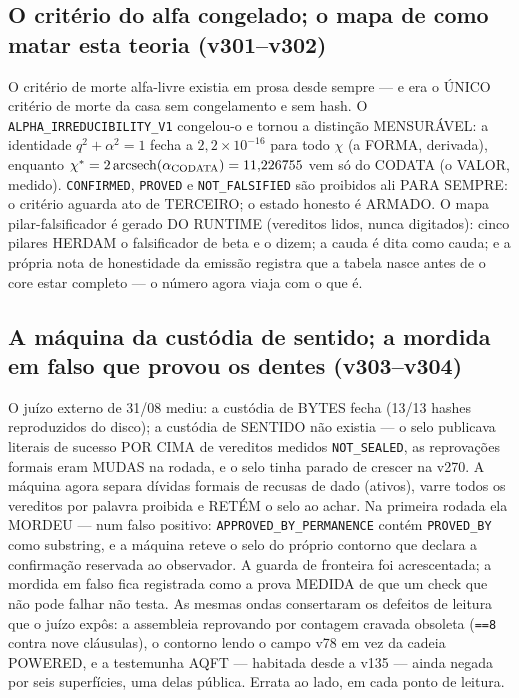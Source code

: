\documentclass[11pt]{article}
\theoremstyle{definition}\newtheorem{deriv}{Derivação}
\begin{document}
\subsection*{O crit\'erio do alfa congelado; o mapa de como matar esta teoria (v301--v302)}O crit\'erio de morte alfa-livre existia em prosa desde sempre --- e era o \'UNICO crit\'erio de morte da casa sem congelamento e sem hash. O \texttt{ALPHA\_IRREDUCIBILITY\_V1} congelou-o e tornou a distin\c{c}\~ao MENSUR\'AVEL: a identidade $q^2+\alpha^2=1$ fecha a $2{,}2\times10^{-16}$ para todo $\chi$ (a FORMA, derivada), enquanto $\chi^*=2\,\mathrm{arcsech}(\alpha_{\rm CODATA})=11{,}226755$ vem s\'o do CODATA (o VALOR, medido). \texttt{CONFIRMED}, \texttt{PROVED} e \texttt{NOT\_FALSIFIED} s\~ao proibidos ali PARA SEMPRE: o crit\'erio aguarda ato de TERCEIRO; o estado honesto \'e ARMADO. O mapa pilar-falsificador \'e gerado DO RUNTIME (vereditos lidos, nunca digitados): cinco pilares HERDAM o falsificador de beta e o dizem; a cauda \'e dita como cauda; e a pr\'opria nota de honestidade da emiss\~ao registra que a tabela nasce antes de o core estar completo --- o n\'umero agora viaja com o que \'e.

\subsection*{A m\'aquina da cust\'odia de sentido; a mordida em falso que provou os dentes (v303--v304)}O ju\'izo externo de 31/08 mediu: a cust\'odia de BYTES fecha (13/13 hashes reproduzidos do disco); a cust\'odia de SENTIDO n\~ao existia --- o selo publicava literais de sucesso POR CIMA de vereditos medidos \texttt{NOT\_SEALED}, as reprova\c{c}\~oes formais eram MUDAS na rodada, e o selo tinha parado de crescer na v270. A m\'aquina agora separa d\'ividas formais de recusas de dado (ativos), varre todos os vereditos por palavra proibida e RET\'EM o selo ao achar. Na primeira rodada ela MORDEU --- num falso positivo: \texttt{APPROVED\_BY\_PERMANENCE} cont\'em \texttt{PROVED\_BY} como substring, e a m\'aquina reteve o selo do pr\'oprio contorno que declara a confirma\c{c}\~ao reservada ao observador. A guarda de fronteira foi acrescentada; a mordida em falso fica registrada como a prova MEDIDA de que um check que n\~ao pode falhar n\~ao testa. As mesmas ondas consertaram os defeitos de leitura que o ju\'izo exp\^os: a assembleia reprovando por contagem cravada obsoleta (\texttt{==8} contra nove cl\'ausulas), o contorno lendo o campo v78 em vez da cadeia POWERED, e a testemunha AQFT --- habitada desde a v135 --- ainda negada por seis superf\'icies, uma delas p\'ublica. Errata ao lado, em cada ponto de leitura.
\end{document}
